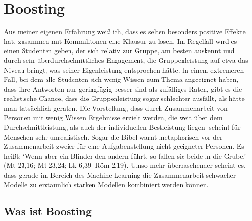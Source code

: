 \section{Boosting}
Aus meiner eigenen Erfahrung weiß ich, dass es selten besonders positive Effekte hat, zusammen mit Kommilitonen eine Klausur zu lösen. Im Regelfall wird es einen Studenten geben, der sich relativ zur Gruppe, am besten auskennt und durch sein überdurchschnittliches Engagement, die Gruppenleistung auf etwa das Niveau bringt, was seiner Eigenleistung entsprochen hätte. 
\newline
In einem extremeren Fall, bei dem alle Studenten sich wenig Wissen zum Thema angeeignet haben, dass ihre Antworten nur geringfügig besser sind als zufälliges Raten, gibt es die realistische Chance, dass die Gruppenleistung sogar schlechter ausfällt, als hätte man tatsächlich geraten.
\newline
\newline
Die Vorstellung, dass durch Zusammenarbeit von Personen mit wenig Wissen Ergebnisse erzielt werden, die weit über dem Durchschnittleistung, als auch der individuellen Bestleistung liegen, scheint für Menschen sehr unrealistisch. Sogar die Bibel warnt metaphorisch vor der Zusammenarbeit zweier für eine Aufgabenstellung nicht geeigneter Personen. Es heißt: `Wenn aber ein Blinder den andern führt, so fallen sie beide in die Grube.' (Mt 23,16; Mt 23,24; Lk 6,39; Röm 2,19). Umso mehr überraschender scheint es, dass gerade im Bereich des Machine Learning die Zusammenarbeit schwacher Modelle zu erstaunlich starken Modellen kombiniert werden können.

\subsection{Was ist Boosting}